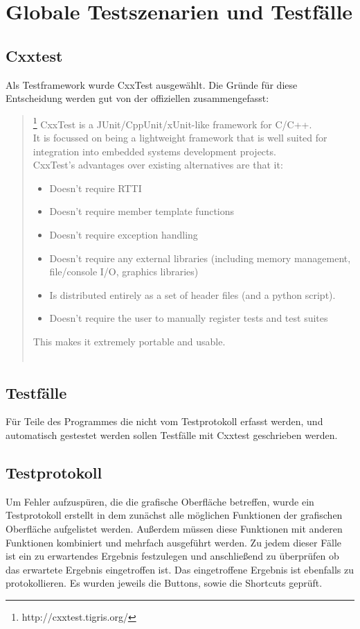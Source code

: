 \section{Globale Testszenarien und Testfälle}
\subsection{Cxxtest}
Als Testframework wurde CxxTest ausgewählt. Die Gründe für diese Entscheidung werden gut von der offiziellen zusammengefasst: 
\begin{quote}\footnote{http://cxxtest.tigris.org/}
    CxxTest is a JUnit/CppUnit/xUnit-like framework for C/C++.\ \\
    It is focussed on being a lightweight framework that is well suited for 
    integration into embedded systems development projects.\ \\
    CxxTest's advantages over existing alternatives are that it:
    \begin{itemize}
        \item Doesn't require RTTI
        \item Doesn't require member template functions
        \item Doesn't require exception handling
        \item Doesn't require any external libraries (including memory management, file/console I/O, graphics libraries)
        \item Is distributed entirely as a set of header files (and a python script).
        \item Doesn't require the user to manually register tests and test suites 
    \end{itemize}
    This makes it extremely portable and usable.\ \\ \\
\end{quote} 
\subsection{Testfälle}
Für Teile des Programmes die nicht vom Testprotokoll erfasst werden, und automatisch gestestet werden sollen Testfälle mit Cxxtest
geschrieben werden.   
\subsection{Testprotokoll}
Um Fehler aufzuspüren, die die grafische Oberfläche betreffen, wurde ein Testprotokoll erstellt in dem zunächst
alle möglichen Funktionen der grafischen Oberfläche aufgelistet werden. Außerdem müssen diese Funktionen mit 
anderen Funktionen kombiniert und mehrfach ausgeführt werden. Zu jedem dieser Fälle ist ein zu erwartendes Ergebnis
festzulegen und anschließend zu überprüfen ob das erwartete Ergebnis eingetroffen ist. Das eingetroffene Ergebnis
ist ebenfalls zu protokollieren. Es wurden jeweils die Buttons, sowie die Shortcuts geprüft.
